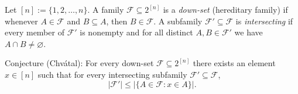Let $[n]:=\{1,2,\dots,n\}$.
A family $\mathcal{F}\subseteq 2^{[n]}$ is a \emph{down-set} (hereditary family) if whenever $A\in\mathcal{F}$ and $B\subseteq A$, then $B\in\mathcal{F}$.
A subfamily $\mathcal{F}'\subseteq \mathcal{F}$ is \emph{intersecting} if every member of $\mathcal{F}'$ is nonempty and for all distinct $A,B\in\mathcal{F}'$ we have $A\cap B\ne\varnothing$.

Conjecture (Chv\'{a}tal): For every down-set $\mathcal{F}\subseteq 2^{[n]}$ there exists an element $x\in [n]$ such that for every intersecting subfamily $\mathcal{F}'\subseteq\mathcal{F}$,
\[|\mathcal{F}'|\le |\{A\in\mathcal{F}: x\in A\}|.
\]
